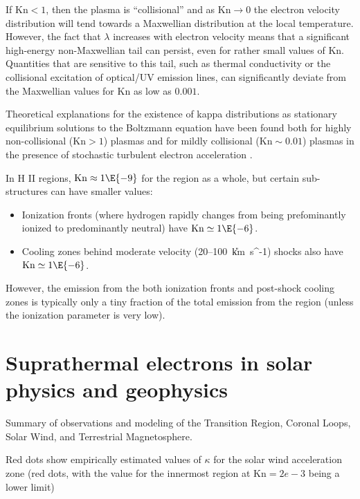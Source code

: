 \documentclass{emulateapj}
\newcommand\Kn{\ensuremath{\mathrm{Kn}}}
\newcommand\kms{\U{km\ s^{-1}}}
\begin{document}
If \(\Kn < 1\), then the plasma is ``collisional'' and as \(\Kn \to
0\) the electron velocity distribution will tend towards a Maxwellian
distribution at the local temperature.  However, the fact that
\(\lambda\) increases with electron velocity means that a significant
high-energy non-Maxwellian tail can persist, even for rather small
values of \Kn.  Quantities that are sensitive to this tail, such as
thermal conductivity or the collisional excitation of optical/UV
emission lines, can significantly deviate from the Maxwellian values
for \Kn{} as low as \(0.001\). 

Theoretical explanations for the existence of kappa distributions as
stationary equilibrium solutions to the Boltzmann equation have been
found both for highly non-collisional (\(\Kn > 1\)) plasmas \citep{Pierrard:2010a,
  Livadiotis:2013a} and for mildly collisional (\(\Kn \sim 0.01\))
plasmas in the presence of stochastic turbulent electron acceleration \citep{Bian:2014a}.


In H II regions, \(\Kn \approx 1\E{-9} \) for the region as a whole, but
certain sub-structures can have smaller values:
\begin{itemize}
\item Ionization fronts (where hydrogen rapidly changes from being
  prefominantly ionized to predominantly neutral) have \(\Kn \simeq
  1\E{-6}\). 
\item Cooling zones behind moderate velocity (20--100~\kms) shocks
  also have \(\Kn \simeq 1\E{-6}\). 
\end{itemize}
However, the emission from the both ionization fronts and post-shock
cooling zones is typically only a tiny fraction of the total emission
from the region (unless the ionization parameter is very low).



\section{Suprathermal electrons in solar physics and geophysics}
\label{sec:supr-electr-solar}

Summary of observations and modeling of the Transition Region, Coronal
Loops, Solar Wind, and Terrestrial Magnetosphere.

Red dots show empirically estimated values of \(\kappa\)
for the solar wind acceleration zone \citep{Esser:2000a} (red dots,
with the value for the innermost region at \(\Kn = 2e-3\)
being a lower limit)
\end{document}
